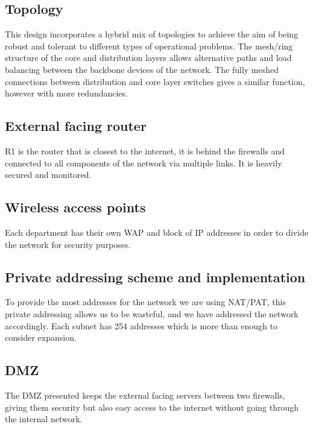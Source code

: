 \subsection{Topology}
This design incorporates a hybrid mix of topologies to achieve the aim of being robust and tolerant to different types of operational problems. The mesh/ring structure of the core and distribution layers allows alternative paths and load balancing between the backbone devices of the network. The fully meshed connections between distribution and core layer switches gives a similar function, however with more redundancies.
\subsection{External facing router}
R1 is the router that is closest to the internet, it is behind the firewalls and connected to all components of the network via multiple links. It is heavily secured and monitored.
\subsection{Wireless access points}
Each department has their own WAP and block of IP addresses in order to divide the network for security purposes. 
\subsection{Private addressing scheme and implementation}
To provide the most addresses for the network we are using NAT/PAT, this private addressing allows us to be wasteful, and we have addressed the network accordingly. Each subnet has 254 addresses which is more than enough to consider expansion.
\subsection{DMZ}
The DMZ presented keeps the external facing servers between two firewalls, giving them security but also easy access to the internet without going through the internal network.